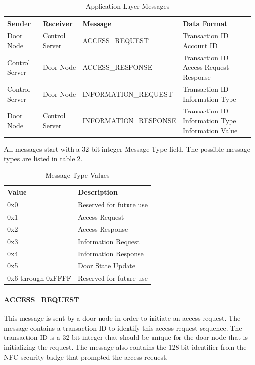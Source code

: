 \begin{table}[htb]
\begin{tabular}{ l | l | l | p{4.5cm} }
\toprule
Sender & Receiver & Message & Data Format\\
\midrule
Door Node & Control Server & ACCESS\_REQUEST &
Transaction ID \newline Account ID\\
\hline
Control Server & Door Node & ACCESS\_RESPONSE &
Transaction ID \newline Access Request Response\\
\hline
Control Server & Door Node & INFORMATION\_REQUEST &
Transaction ID \newline Information Type\\
\hline
Door Node & Control Server & INFORMATION\_RESPONSE &
Transaction ID \newline Information Type \newline Information Value\\
\bottomrule
\end{tabular}
\caption{Application Layer Messages}
\label{tab:app-layer-messages}
\end{table}

All messages start with a 32 bit integer Message Type field. The possible
message types are listed in table \ref{tab:message-types}.

\begin{table}[htb]
\centering
\begin{tabular}{@{}ll@{}}
\toprule
Value               &   Description \\
\midrule
0x0                 &   Reserved for future use \\
0x1                 &   Access Request \\
0x2                 &   Access Response \\
0x3                 &   Information Request \\
0x4                 &   Information Response \\
0x5                 &   Door State Update \\
0x6 through 0xFFFF  &   Reserved for future use \\
\bottomrule
\end{tabular}
\caption{Message Type Values}
\label{tab:message-types}
\end{table}

\paragraph{ACCESS\_REQUEST}
This message is sent by a door node in order to initiate an access request. The
message contains a transaction ID to identify this access request sequence. The
transaction ID is a 32 bit integer that should be unique for the door node that
is initializing the request. The message also contains the 128 bit identifier
from the NFC security badge that prompted the access request.

